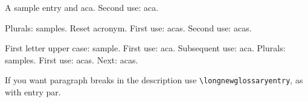 \documentclass{article}
\begin{document}
A \gls{sample} entry and \gls{aca}. Second use: \gls{aca}.

Plurals: \glspl{sample}. Reset acronym.
First use: \glspl{aca}. Second use: \glspl{aca}.

\glsresetall
First letter upper case: \Gls{sample}. First use: \Gls{aca}.
Subsequent use: \Gls{aca}.
\glsresetall
Plurals: \Glspl{sample}. First use: \Glspl{aca}. Next: \Glspl{aca}.

If you want paragraph breaks in the description use
\verb|\longnewglossaryentry|, as with entry \gls{par}.

\printglossaries
\end{document}
